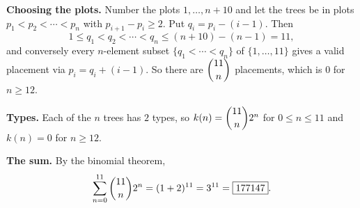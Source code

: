 \textbf{Choosing the plots.} Number the plots $1,\dots,n+10$ and let the trees be in plots $p_1<p_2<\cdots<p_n$ with $p_{i+1}-p_i\ge2$. Put $q_i=p_i-(i-1)$. Then
\[1\le q_1<q_2<\cdots<q_n\le(n+10)-(n-1)=11,\]
and conversely every $n$-element subset $\{q_1<\cdots<q_n\}$ of $\{1,\dots,11\}$ gives a valid placement via $p_i=q_i+(i-1)$. So there are $\dbinom{11}{n}$ placements, which is $0$ for $n\ge12$.

\textbf{Types.} Each of the $n$ trees has $2$ types, so $k(n)=\dbinom{11}{n}2^n$ for $0\le n\le11$ and $k(n)=0$ for $n\ge12$.

\textbf{The sum.} By the binomial theorem,
\[\sum_{n=0}^{11}\dbinom{11}{n}2^n=(1+2)^{11}=3^{11}=\boxed{177147}.\]
